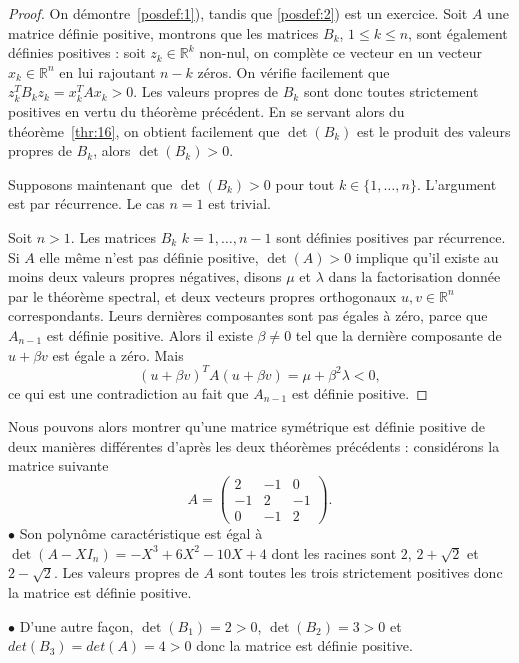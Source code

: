 \begin{proof}

On démontre~\ref{posdef:1}), tandis que \ref{posdef:2}) est un exercice. 
Soit $A$ une matrice définie positive, montrons que   
les matrices $B_k$, $ 1 \leq k \leq n$,  sont également définies positives : soit $z_k \in \mathbb R^k$ non-nul, 
on complète ce vecteur en un vecteur $x_k \in \mathbb R^n$ en lui rajoutant $n-k$ zéros.
On vérifie facilement que $z_k^T B_k z_k = x_k^T A x_k > 0$. 
Les valeurs propres de $B_k$ sont donc toutes strictement positives en vertu du théorème précédent. 
En se servant alors du théorème~\ref{thr:16}, on obtient facilement que $\det(B_k)$ est le produit des valeurs propres de $B_k$, alors $\det(B_k)>0$. 

Supposons maintenant que $\det(B_k)>0$ pour tout $k \in \{1,\dots,n\}$.
L'argument est par récurrence. Le cas $n=1$ est trivial.

Soit $n>1$. Les matrices $B_k$ $k=1,\dots,n-1$ sont définies positives par récurrence. Si $A$ elle même n'est pas définie positive, $\det(A)>0$ implique qu'il existe au moins deux valeurs propres négatives, disons $μ$ et $λ$ dans la factorisation donnée par le théorème spectral, et deux vecteurs propres orthogonaux $u,v ∈ ℝ^n$ correspondants.  Leurs dernières composantes sont pas égales à zéro, parce que $A_{n-1}$ est définie positive. Alors il existe $β ≠ 0$ tel que la dernière composante de $u+ β v$ est égale a zéro. Mais
\begin{displaymath}
  (u+ β v)^T A (u+ β v) = μ + β^2 λ <0,
\end{displaymath}
ce qui est une contradiction  au fait que $A_{n-1}$ est définie positive. 
\end{proof}
\begin{example}
  \label{exe:18}
  Nous pouvons alors montrer qu'une matrice symétrique est définie positive de deux manières différentes d'après les deux théorèmes précédents : considérons la matrice suivante
  \begin{displaymath}
    A =
    \begin{pmatrix}
    2 & -1  & 0 \\
      -1 & 2 & -1 \\
      0 & -1 & 2 
    \end{pmatrix}. 
  \end{displaymath}
$\bullet$ Son polynôme caractéristique est égal à $\det(A-XI_n)=-X^3+6X^2-10X+4$ dont les racines sont $2$, $2+\sqrt{2}$ et $2-\sqrt{2}$. Les valeurs propres de $A$ sont toutes les trois strictement positives donc la matrice est définie positive.

$\bullet$ D'une autre façon, $\det(B_1)=2 >0$, $\det(B_2)=3 > 0$ et $det(B_3)=det(A)=4 >0$ donc la matrice est définie positive.

\end{example}
